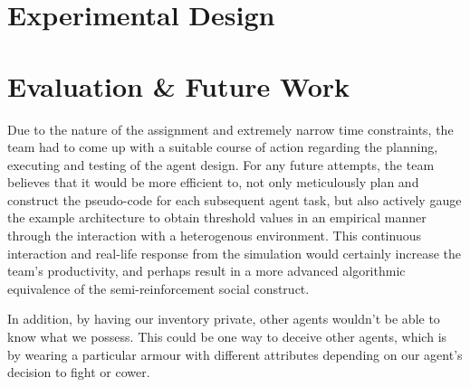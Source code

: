 


\section{Experimental Design}






\section{Evaluation \& Future Work}

Due to the nature of the assignment and extremely narrow time constraints, the team had to come up with a suitable course of action regarding the planning, executing and testing of the agent design. For any future attempts, the team believes that it would be more efficient to, not only meticulously plan and construct the pseudo-code for each subsequent agent task, but also actively gauge the example architecture to obtain threshold values in an empirical manner through the interaction with a heterogenous environment. This continuous interaction and real-life response from the simulation would certainly increase the team's productivity, and perhaps result in a more advanced algorithmic equivalence of the semi-reinforcement social construct.

In addition, by having our inventory private, other agents wouldn't be able to know what we possess. This could be one way to deceive other agents, which is by wearing a particular armour with different attributes depending on our agent's decision to fight or cower. 